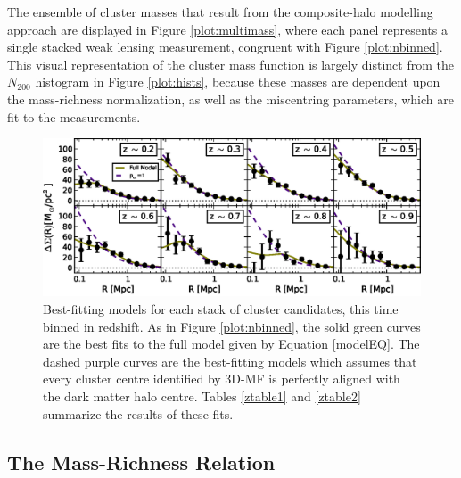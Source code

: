 The ensemble of cluster masses that result from the composite-halo modelling approach are displayed in Figure \ref{plot:multimass}, where each panel represents a single stacked weak lensing measurement, congruent with Figure \ref{plot:nbinned}. This visual representation of the cluster mass function is largely distinct from the $N_{200}$ histogram in Figure \ref{plot:hists}, because these masses are dependent upon the mass-richness normalization, as well as the miscentring parameters, which are fit to the measurements.


\begin{figure}
\begin{center}
  \includegraphics[scale=1.0]{plots_ch4/shearFit_zpanels_fcc0and1_slopeMN1p5_DuttonMaccio.eps}
  \caption[Shear for Redshift-Binned Clusters]{Best-fitting models for each stack of cluster candidates, this time binned in redshift. As in Figure \ref{plot:nbinned}, the solid green curves are the best fits to the full model given by Equation \ref{modelEQ}. The dashed purple curves are the best-fitting models which assumes that every cluster centre identified by \ac{3D-MF} is perfectly aligned with the dark matter halo centre. Tables \ref{ztable1} and \ref{ztable2} summarize the results of these fits.}
\label{plot:zbinned}
\end{center}
\end{figure}


\subsection{The Mass-Richness Relation}

